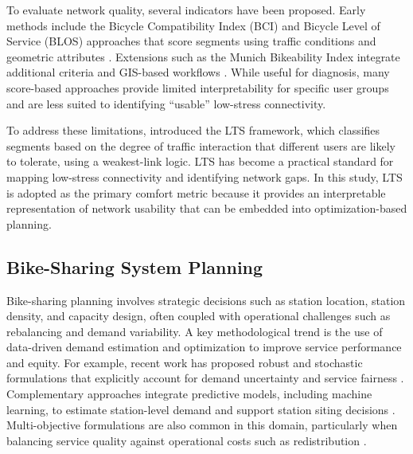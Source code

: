 \documentclass[preprint,authoryear,10pt]{elsarticle}
\begin{document}
To evaluate network quality, several indicators have been proposed. Early methods include the Bicycle Compatibility Index (BCI) \citep{harkey1998DevelopmentBicycleCompatibility} and Bicycle Level of Service (BLOS) approaches that score segments using traffic conditions and geometric attributes \citep{jensen2007PedestrianBicyclistLevel, petritsch2007BicycleLevelService}. Extensions such as the Munich Bikeability Index integrate additional criteria and GIS-based workflows \citep{schmid-querg2021MunichBikeabilityIndex}. While useful for diagnosis, many score-based approaches provide limited interpretability for specific user groups and are less suited to identifying ``usable'' low-stress connectivity.

To address these limitations, \citet{mekuria_low-stress_2012} introduced the LTS framework, which classifies segments based on the degree of traffic interaction that different users are likely to tolerate, using a weakest-link logic. LTS has become a practical standard for mapping low-stress connectivity and identifying network gaps. In this study, LTS is adopted as the primary comfort metric because it provides an interpretable representation of network usability that can be embedded into optimization-based planning.

\subsection{Bike-Sharing System Planning}

Bike-sharing planning involves strategic decisions such as station location, station density, and capacity design, often coupled with operational challenges such as rebalancing and demand variability. A key methodological trend is the use of data-driven demand estimation and optimization to improve service performance and equity. For example, recent work has proposed robust and stochastic formulations that explicitly account for demand uncertainty and service fairness \citep{chen2023target, nikiforiadis2021determining, jin2020Robustbikesharingstations}. Complementary approaches integrate predictive models, including machine learning, to estimate station-level demand and support station siting decisions \citep{7373406}. Multi-objective formulations are also common in this domain, particularly when balancing service quality against operational costs such as redistribution \citep{8932534, soriguera2020continuous}.
\end{document}

